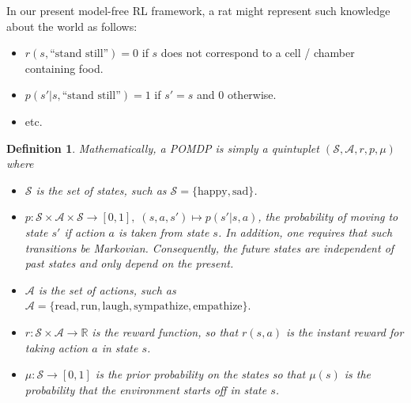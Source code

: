 \documentclass[10pt,letterpaper]{article}
\newtheorem{definition}[theorem]{Definition}
\newtheorem{remark}{Remark}
\begin{document}
In our present model-free RL framework,
a rat might represent such knowledge about the world as follows:
\begin{itemize}
\item $r(s, \text{``stand still''}) = 0$ if $s$ does not correspond to a cell / chamber containing food.
\item $p(s'|s,\text{``stand still''}) = 1$ if $s'=s$ and $0$ otherwise.
\item etc.
\end{itemize}

\begin{definition}
Mathematically, a POMDP is simply a quintuplet $(\mathcal S, \mathcal A, r, p, \mu)$ where
\begin{itemize}
\item $\mathcal S$ is the set of states, such as $\mathcal S = \{\text{happy}, \text{sad}\}$.
\item $p : \mathcal S \times \mathcal A \times \mathcal S \rightarrow [0, 1],\; (s,a,s') \mapsto p(s'|s,a)$,
  the probability of moving to state $s'$ if action $a$ is taken from state $s$. In addition, one requires that such
  transitions be Markovian. Consequently, the future states are independent of past states and only depend on the present.
\item $\mathcal A$ is the set of actions, such as $\mathcal A = \{\text{read}, \text{run},
  \text{laugh}, \text{sympathize}, \text{empathize}\}.$
\item $r : \mathcal S \times \mathcal A \rightarrow \mathbb R$ is the \textit{reward function},
  so that $r(s, a)$ is the instant reward for taking action $a$ in state $s$.
\item $\mu: \mathcal S \rightarrow [0, 1]$ is the prior probability on the states so that
  $\mu(s)$ is the probability that the environment starts off in state $s$.
\end{itemize}

\end{definition}
\end{document}
